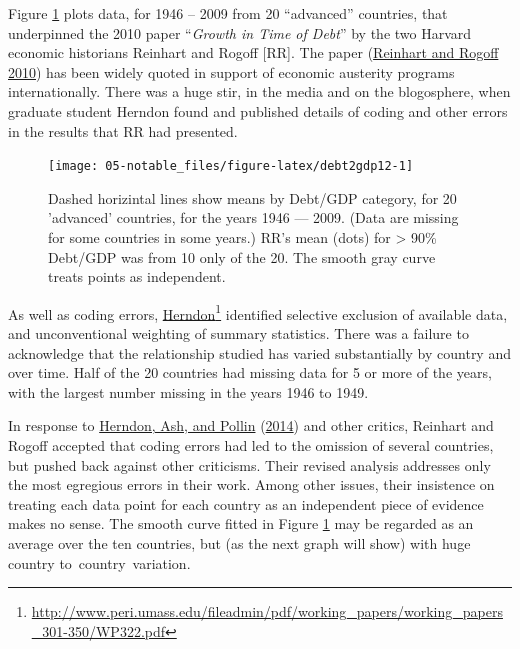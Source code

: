 \documentclass[
  10pt,
  b5paper]{book}
\begin{document}
Figure \ref{fig:debt2gdp12} plots data, for 1946 -- 2009
from 20 ``advanced'' countries, that underpinned the 2010
paper ``\emph{Growth in Time of Debt}'' by the two Harvard economic
historians Reinhart and Rogoff {[}RR{]}. The paper (\protect\hyperlink{ref-reinhart2010growth}{Reinhart and Rogoff 2010})
has been widely quoted in support of economic austerity programs
internationally. There was a huge stir, in the media and on the
blogosphere, when graduate student Herndon found and published
details of coding and other errors in the results that RR had
presented.

\begin{figure}[H]

{\centering \texttt{[image: 05-notable\_files/figure-latex/debt2gdp12-1]} 

}

\caption{Dashed horizintal lines show means by Debt/GDP category, 
for 20 'advanced' countries, for the years 1946 --- 2009.
(Data are missing for some countries in some years.)
RR's mean (dots) for > 90\% Debt/GDP was from 10 only of the 20. 
The smooth gray curve treats points as independent.}\label{fig:debt2gdp12}
\end{figure}

As well as coding errors,
\href{http://www.peri.umass.edu/fileadmin/pdf/working_papers/working_papers_301-350/WP322.pdf}{Herndon}\footnote{\url{http://www.peri.umass.edu/fileadmin/pdf/working_papers/working_papers_301-350/WP322.pdf}} identified selective exclusion of available data,
and unconventional weighting of summary statistics. There was a
failure to acknowledge that the relationship studied has varied
substantially by country and over time. Half of the 20 countries
had missing data for 5 or more of the years, with the largest
number missing in the years 1946 to 1949.

In response to \protect\hyperlink{ref-herndon2014does}{Herndon, Ash, and Pollin} (\protect\hyperlink{ref-herndon2014does}{2014}) and other critics, Reinhart and
Rogoff accepted that coding errors had led to the omission of
several countries, but pushed back against other criticisms.
Their revised analysis addresses only the most egregious errors
in their work. Among other issues, their insistence on treating
each data point for each country as an independent piece of
evidence makes no sense. The smooth curve fitted in Figure
\ref{fig:debt2gdp12} may be regarded as an average over the
ten countries, but (as the next graph will show) with huge country
to~country~variation.
\end{document}
